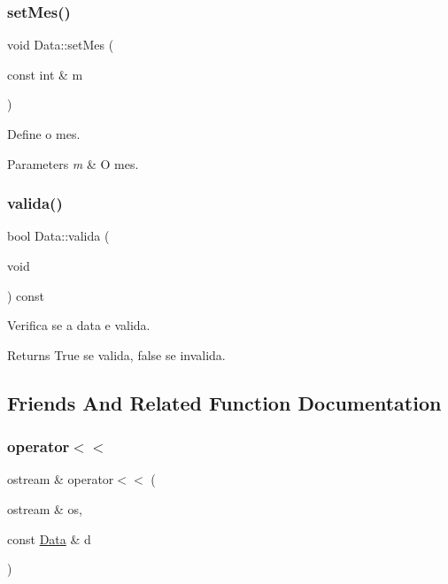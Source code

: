 \subsubsection{\texorpdfstring{set\+Mes()}{setMes()}}
{\footnotesize\ttfamily void Data\+::set\+Mes (\begin{DoxyParamCaption}\item[{const int \&}]{m }\end{DoxyParamCaption})}



Define o mes. 


\begin{DoxyParams}{Parameters}
{\em m} & O mes. \\
\hline
\end{DoxyParams}
\hypertarget{class_data_af16b870e20e2993ad585a01407efb8d5}{}\label{class_data_af16b870e20e2993ad585a01407efb8d5} 
\subsubsection{\texorpdfstring{valida()}{valida()}}
{\footnotesize\ttfamily bool Data\+::valida (\begin{DoxyParamCaption}\item[{void}]{ }\end{DoxyParamCaption}) const}



Verifica se a data e valida. 

\begin{DoxyReturn}{Returns}
True se valida, false se invalida. 
\end{DoxyReturn}


\subsection{Friends And Related Function Documentation}
\hypertarget{class_data_a610a7c48e852afcc4874e1d5f0ed8f96}{}\label{class_data_a610a7c48e852afcc4874e1d5f0ed8f96} 
\subsubsection{\texorpdfstring{operator$<$$<$}{operator<<}}
{\footnotesize\ttfamily ostream \& operator$<$$<$ (\begin{DoxyParamCaption}\item[{ostream \&}]{os,  }\item[{const \hyperlink{class_data}{Data} \&}]{d }\end{DoxyParamCaption})\hspace{0.3cm}{\ttfamily [friend]}}



